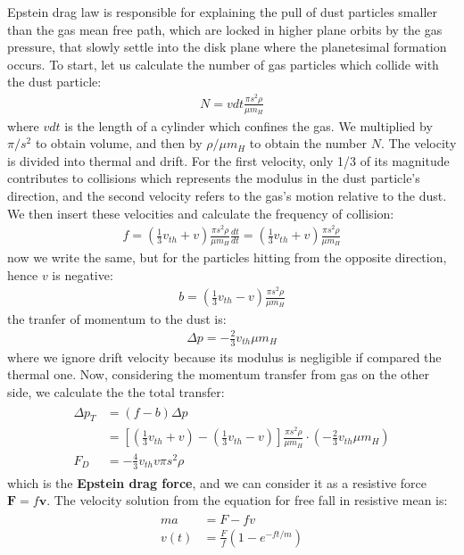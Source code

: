 \documentclass[12pt,a4paper]{article}
\begin{document}
Epstein drag law is responsible for explaining the pull of dust particles smaller than the gas mean free path, which are locked in higher plane orbits by the gas pressure, that slowly settle into the disk plane where the planetesimal formation occurs. To start, let us calculate the number of gas particles which collide with the dust particle:
\begin{align}
    N=vdt\frac{\pi s^2\rho}{\mu m_H}
\end{align}
where $vdt$ is the length of a cylinder which confines the gas. We multiplied by $\pi/s^2$ to obtain volume, and then by $\rho/\mu m_H$ to obtain the number $N$. The velocity is divided into thermal and drift. For the first velocity, only 1/3 of its magnitude contributes to collisions which represents the modulus in the dust particle's direction, and the second velocity refers to the gas's motion relative to the dust. We then insert these velocities and calculate the frequency of collision:
\begin{align}
    f=(\frac{1}{3}v_{th}+v)\frac{\pi s^2\rho}{\mu m_H}\frac{dt}{dt}=(\frac{1}{3}v_{th}+v)\frac{\pi s^2\rho}{\mu m_H}
\end{align}
now we write the same, but for the particles hitting from the opposite direction, hence $v$ is negative:
\begin{align}
    b=(\frac{1}{3}v_{th}-v)\frac{\pi s^2\rho}{\mu m_H}
\end{align}
the tranfer of momentum to the dust is:
\begin{align}
    \Delta p=-\frac{2}{3}v_{th}\mu m_H
\end{align}
where we ignore drift velocity because its modulus is negligible if compared the thermal one. Now, considering the momentum transfer from gas on the other side, we calculate the the total transfer:
\begin{align}
\begin{split}
    \Delta p_T&=(f-b)\Delta p \\
    &=[(\frac{1}{3}v_{th}+v)-(\frac{1}{3}v_{th}-v)]\frac{\pi s^2\rho}{\mu m_H}\cdot(-\frac{2}{3}v_{th}\mu m_H) \\
    F_D&=-\frac{4}{3}v_{th}v\pi s^2\rho
\end{split}
\end{align}
which is the \textbf{Epstein drag force}, and we can consider it as a resistive force $\textbf{F}=f\textbf{v}$. The velocity solution from the equation for free fall in resistive mean is:
\begin{align}
\begin{split}
    ma&=F-fv \\
    v(t)&=\frac{F}{f}(1-e^{-ft/m})
\end{split}
\end{align}
\end{document}
